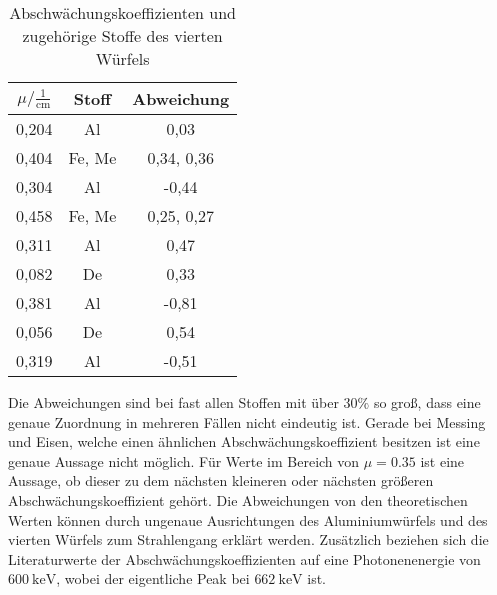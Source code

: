 \begin{table}[H]
  \centering
  \caption{Abschwächungskoeffizienten und zugehörige Stoffe des vierten Würfels}
  \label{tab:abw}
  \begin{tabular}{c c c}
    \toprule
    $\mu/ \mathrm{\frac{1}{cm}}$ & Stoff & Abweichung   \\
    \midrule
    0,204      &  Al     &   0,03    \\
    0,404      &  Fe, Me &   0,34, 0,36    \\
    0,304      &  Al     &  -0,44    \\
    0,458      &  Fe, Me &   0,25, 0,27    \\
    0,311      &  Al     &   0,47    \\
    0,082      &  De     &   0,33    \\
    0,381      &  Al     &  -0,81    \\
    0,056      &  De     &   0,54   \\
    0,319      &  Al     &  -0,51  \\
    \bottomrule
  \end{tabular}
\end{table}

Die Abweichungen sind bei fast allen Stoffen mit über $30\%$ so groß, dass
eine genaue Zuordnung in mehreren Fällen nicht eindeutig ist. Gerade bei Messing und
Eisen, welche einen ähnlichen Abschwächungskoeffizient besitzen ist eine genaue
Aussage nicht möglich. Für Werte im Bereich von $\mu = 0.35$ ist eine Aussage, ob
dieser zu dem nächsten kleineren oder nächsten größeren Abschwächungskoeffizient
gehört. Die Abweichungen von den theoretischen Werten können durch ungenaue Ausrichtungen des
Aluminiumwürfels und des vierten Würfels zum Strahlengang erklärt werden.
Zusätzlich beziehen sich die Literaturwerte der Abschwächungskoeffizienten auf
eine Photonenenergie von $\SI{600}{\kilo\eV}$, wobei der eigentliche Peak
bei $\SI{662}{\kilo\eV}$ ist.
